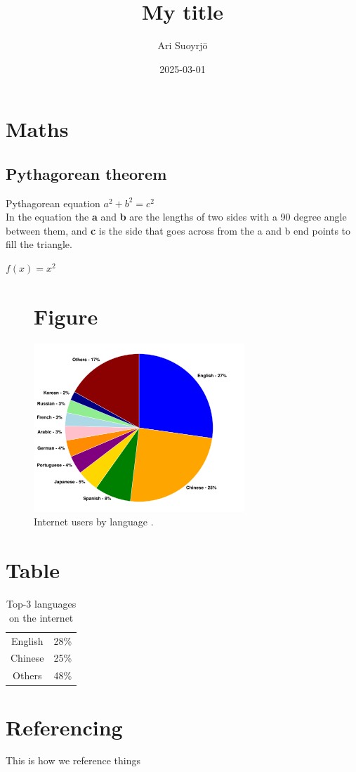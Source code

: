 \documentclass{article}
\title{My title}
\date{2025-03-01}
\author{Ari Suoyrjö}
\begin{document}
\maketitle
\newpage
\tableofcontents
\newpage
{}
\section{Maths}
\subsection{Pythagorean theorem}
Pythagorean equation $a^2 + b^2 = c^2$ \\
In the equation the \textbf{a} and \textbf{b} are the lengths of two sides with a 90 degree angle between them, and \textbf{c} is the side that goes across from the a and b end points to fill the triangle. \\

\begin{center}
$f(x) = x^2$
\end{center}

\begin{figure}[h]
\section{Figure}
\includegraphics{InternetUsersByLanguagePieChart.svg.png}
\caption{Internet users by language \cite{InternetUsersByLanguagePieChart}.}
\end{figure}

\begin{table}[h]
\section{Table} %
\begin{center}
\begin{tabular}{ |c|c| }
English & 28\% \\
Chinese & 25\% \\
Others &  48\% \\
\end{tabular}
\caption{Top-3 languages on the internet}
\end{center}
\end{table}

\section{Referencing}
This is how we reference things


\end{document}
